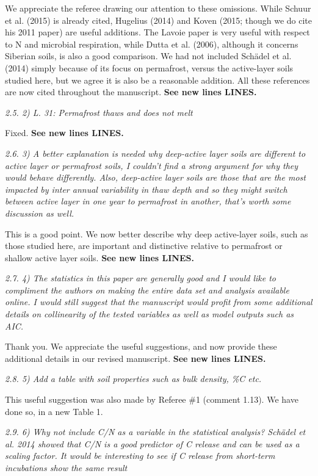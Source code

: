 \documentclass[11pt, oneside]{article}
\begin{document}
We appreciate the referee drawing our attention to these omissions. While Schuur et al. (2015) is already cited, Hugelius (2014) and Koven (2015; though we do cite his 2011 paper) are useful additions. The Lavoie paper is very useful with respect to N and microbial respiration, while Dutta et al. (2006), although it concerns Siberian soils, is also a good comparison. We had not included Schädel et al. (2014) simply because of its focus on permafrost, versus the active-layer soils studied here, but we agree it is also be a reasonable addition. All these references are now cited throughout the manuscript. {\bf See new lines LINES.}

\medskip
{\it 2.5. 2) L. 31: Permafrost thaws and does not melt }

Fixed. {\bf See new lines LINES.}

\medskip
{\it 2.6. 3) A better explanation is needed why deep-active layer soils are different to active layer or permafrost soils, I couldn't find a strong argument for why they would behave differently. Also, deep-active layer soils are those that are the most impacted by inter annual variability in thaw depth and so they might switch between active layer in one year to permafrost in another, that's worth some discussion as well. }

This is a good point. We now better describe why deep active-layer soils, such as those studied here, are important and distinctive relative to permafrost or shallow active layer soils. {\bf See new lines LINES.}

\medskip
{\it 2.7. 4) The statistics in this paper are generally good and I would like to compliment the authors on making the entire data set and analysis available online. I would still suggest that the manuscript would profit from some additional details on collinearity of the tested variables as well as model outputs such as AIC. }

Thank you. We appreciate the useful suggestions, and now provide these additional details in our revised manuscript. {\bf See new lines LINES.}

\medskip
{\it 2.8. 5) Add a table with soil properties such as bulk density, \%C etc. }

This useful suggestion was also made by Referee \#1 (comment 1.13). We have done so, in a new Table 1.

\medskip
{\it 2.9. 6) Why not include C/N as a variable in the statistical analysis? Schädel et al. 2014 showed that C/N is a good predictor of C release and can be used as a scaling factor. It would be interesting to see if C release from short-term incubations show the same result }
\end{document}
